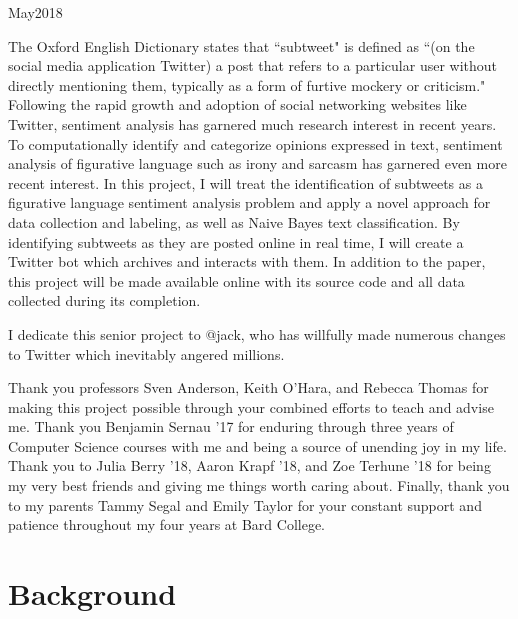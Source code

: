 \documentclass[11pt, twoside, reqno]{book}
\begin{document}
    {May}{2018}

\abstr

The Oxford English Dictionary states that ``subtweet" is defined as ``(on the social media application Twitter) a post that refers to a particular user without directly mentioning them, typically as a form of furtive mockery or criticism." Following the rapid growth and adoption of social networking websites like Twitter, sentiment analysis has garnered much research interest in recent years. To computationally identify and categorize opinions expressed in text, sentiment analysis of figurative language such as irony and sarcasm has garnered even more recent interest. In this project, I will treat the identification of subtweets as a figurative language sentiment analysis problem and apply a novel approach for data collection and labeling, as well as Naive Bayes text classification. By identifying subtweets as they are posted online in real time, I will create a Twitter bot which archives and interacts with them. In addition to the paper, this project will be made available online with its source code and all data collected during its completion.

\tableofcontents

\dedic

I dedicate this senior project to @jack, who has willfully made numerous changes to Twitter which inevitably angered millions.

\acknowl

Thank you professors Sven Anderson, Keith O'Hara, and Rebecca Thomas for making this project possible through your combined efforts to teach and advise me. Thank you Benjamin Sernau '17 for enduring through three years of Computer Science courses with me and being a source of unending joy in my life. Thank you to Julia Berry '18, Aaron Krapf '18, and Zoe Terhune '18 for being my very best friends and giving me things worth caring about. Finally, thank you to my parents Tammy Segal and Emily Taylor for your constant support and patience throughout my four years at Bard College. 

\startmain


\intro

\section{Background}
\label{background}
\end{document}
